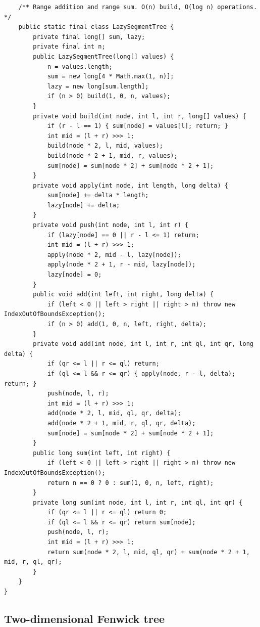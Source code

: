 \documentclass[10pt,letterpaper]{article}
\begin{document}
\begin{lstlisting}
    /** Range addition and range sum. O(n) build, O(log n) operations. */
    public static final class LazySegmentTree {
        private final long[] sum, lazy;
        private final int n;
        public LazySegmentTree(long[] values) {
            n = values.length;
            sum = new long[4 * Math.max(1, n)];
            lazy = new long[sum.length];
            if (n > 0) build(1, 0, n, values);
        }
        private void build(int node, int l, int r, long[] values) {
            if (r - l == 1) { sum[node] = values[l]; return; }
            int mid = (l + r) >>> 1;
            build(node * 2, l, mid, values);
            build(node * 2 + 1, mid, r, values);
            sum[node] = sum[node * 2] + sum[node * 2 + 1];
        }
        private void apply(int node, int length, long delta) {
            sum[node] += delta * length;
            lazy[node] += delta;
        }
        private void push(int node, int l, int r) {
            if (lazy[node] == 0 || r - l <= 1) return;
            int mid = (l + r) >>> 1;
            apply(node * 2, mid - l, lazy[node]);
            apply(node * 2 + 1, r - mid, lazy[node]);
            lazy[node] = 0;
        }
        public void add(int left, int right, long delta) {
            if (left < 0 || left > right || right > n) throw new IndexOutOfBoundsException();
            if (n > 0) add(1, 0, n, left, right, delta);
        }
        private void add(int node, int l, int r, int ql, int qr, long delta) {
            if (qr <= l || r <= ql) return;
            if (ql <= l && r <= qr) { apply(node, r - l, delta); return; }
            push(node, l, r);
            int mid = (l + r) >>> 1;
            add(node * 2, l, mid, ql, qr, delta);
            add(node * 2 + 1, mid, r, ql, qr, delta);
            sum[node] = sum[node * 2] + sum[node * 2 + 1];
        }
        public long sum(int left, int right) {
            if (left < 0 || left > right || right > n) throw new IndexOutOfBoundsException();
            return n == 0 ? 0 : sum(1, 0, n, left, right);
        }
        private long sum(int node, int l, int r, int ql, int qr) {
            if (qr <= l || r <= ql) return 0;
            if (ql <= l && r <= qr) return sum[node];
            push(node, l, r);
            int mid = (l + r) >>> 1;
            return sum(node * 2, l, mid, ql, qr) + sum(node * 2 + 1, mid, r, ql, qr);
        }
    }
}
\end{lstlisting}
\subsection{Two-dimensional Fenwick tree}
\end{document}
